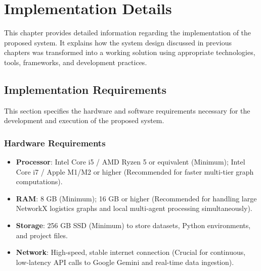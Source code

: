 \chapter[Implementation Details]{Implementation Details}
\sloppy
This chapter provides detailed information regarding the implementation of the proposed
system. It explains how the system design discussed in previous chapters was transformed
into a working solution using appropriate technologies, tools, frameworks, and development
practices.

\section[Implementation Requirements]{Implementation Requirements}
This section specifies the hardware and software requirements necessary for the development
and execution of the proposed system.

\subsection[Hardware Requirements]{Hardware Requirements}
\begin{itemize}
\item \textbf{Processor}: Intel Core i5 / AMD Ryzen 5 or equivalent (Minimum); Intel Core i7 / Apple M1/M2 or higher (Recommended for faster multi-tier graph computations).
\item \textbf{RAM}: 8 GB (Minimum); 16 GB or higher (Recommended for handling large NetworkX logistics graphs and local multi-agent processing simultaneously).
\item \textbf{Storage}: 256 GB SSD (Minimum) to store datasets, Python environments, and project files.
\item \textbf{Network}: High-speed, stable internet connection (Crucial for continuous, low-latency API calls to Google Gemini and real-time data ingestion).
\end{itemize}

